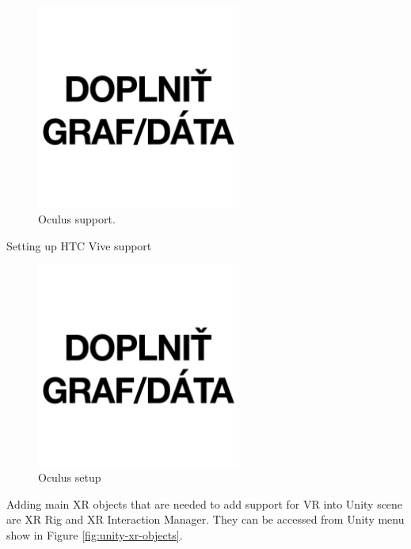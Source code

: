 \begin{figure}[!ht]
	\centering
	\includegraphics[width=0.6\textwidth]{figures/empty.jpg}
	\caption{Oculus support.}
	\label{fig:unity-oculus-support}
\end{figure}

Setting up HTC Vive support

\begin{figure}[!ht]
	\centering
	\includegraphics[width=0.6\textwidth]{figures/empty.jpg}
	\caption{Oculus setup}
	\label{fig:unity-htc-support}
\end{figure}

Adding main XR objects that are needed to add support for VR into Unity scene are XR Rig and XR Interaction Manager. They can be accessed from Unity menu show in Figure \ref{fig:unity-xr-objects}.

